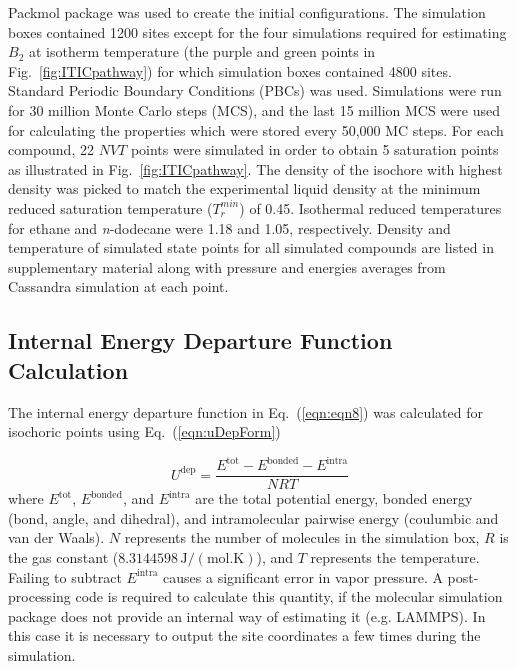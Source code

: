 \documentclass[%
 aip,
 jcp,
 sd,%
 amsmath,amssymb,
 reprint,%
]{revtex4-1}
\begin{document}
Packmol \cite{martinez2009packmol} package was used to create the initial configurations. The simulation boxes contained 1200 sites except for the four simulations required for estimating $B_2$ at isotherm temperature (the purple and green points in Fig.~\ref{fig:ITICpathway}) for which simulation boxes contained 4800 sites. Standard Periodic Boundary Conditions (PBCs) was used. Simulations were run for 30 million Monte Carlo steps (MCS), and the last 15 million MCS were used for calculating the properties which were stored every 50,000 MC steps. For each compound, 22 $NVT$ points were simulated in order to obtain 5 saturation points as illustrated in Fig.~\ref{fig:ITICpathway}. The density of the isochore with highest density was picked to match the experimental liquid density at the minimum reduced saturation temperature ($T_r^{min}$) of 0.45. Isothermal reduced temperatures for ethane and \textit{n}-dodecane were 1.18 and 1.05, respectively. Density and temperature of simulated state points for all simulated compounds are listed in supplementary material along with pressure and energies averages from Cassandra simulation at each point.

\subsection{Internal Energy Departure Function Calculation}\label{sec:udepCalc}
The internal energy departure function in Eq.~(\ref{eqn:eqn8}) was calculated for isochoric points using Eq.~(\ref{eqn:uDepForm})

\begin{equation}
U^{\mathrm{dep}} = \frac{E^{\mathrm{tot}} - E^{\mathrm{bonded}} - E^{\mathrm{intra}}}{NRT}\label{eqn:uDepForm}
\end{equation}
where $E^{\mathrm{tot}}$, $E^{\mathrm{bonded}}$, and $E^{\mathrm{intra}}$ are the total potential energy, bonded energy (bond, angle, and dihedral), and intramolecular pairwise energy (coulumbic and van der Waals). $N$ represents the number of molecules in the simulation box, $R$ is the gas constant ($8.3144598\,\mathrm{J/(mol.K)}$), and $T$ represents the temperature. Failing to subtract $E^{\mathrm{intra}}$ causes a significant error in vapor pressure. A post-processing code is required to calculate this quantity, if the molecular simulation package does not provide an internal way of estimating it (e.g. LAMMPS). In this case it is necessary to output the site coordinates a few times during the simulation.
\end{document}

